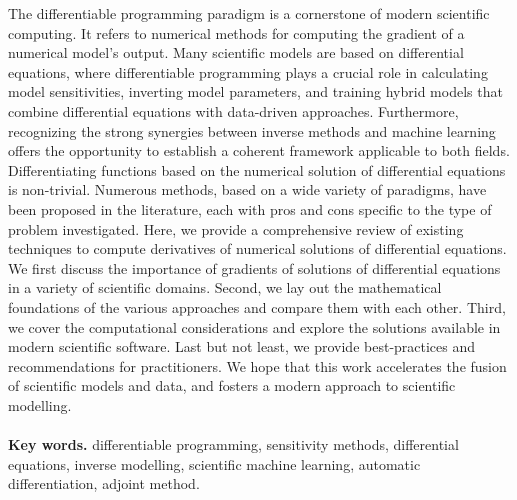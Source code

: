 {\footnotesize
The differentiable programming paradigm is a cornerstone of modern scientific computing. 
It refers to numerical methods for computing the gradient of a numerical model's output. 
Many scientific models are based on differential equations, where differentiable programming plays a crucial role in calculating model sensitivities, inverting model parameters, and training hybrid models that combine differential equations with data-driven approaches.
Furthermore, recognizing the strong synergies between inverse methods and machine learning offers the opportunity to establish a coherent framework applicable to both fields.
Differentiating functions based on the numerical solution of differential equations is non-trivial. 
Numerous methods, based on a wide variety of paradigms, have been proposed in the literature, each with pros and cons specific to the type of problem investigated.
Here, we provide a comprehensive review of existing techniques to compute derivatives of numerical solutions of differential equations.
We first discuss the importance of gradients of solutions of differential equations in a variety of scientific domains.
Second, we lay out the mathematical foundations of the various approaches and compare them with each other. 
Third, we cover the computational considerations and explore the solutions available in modern scientific software.
Last but not least, we provide best-practices and recommendations for practitioners. 
We hope that this work accelerates the fusion of scientific models and data, and fosters a modern approach to scientific modelling.
\\ \\
\noindent \textbf{Key words.} differentiable programming, sensitivity methods, differential equations, inverse modelling, scientific machine learning, automatic differentiation, adjoint method.
}
